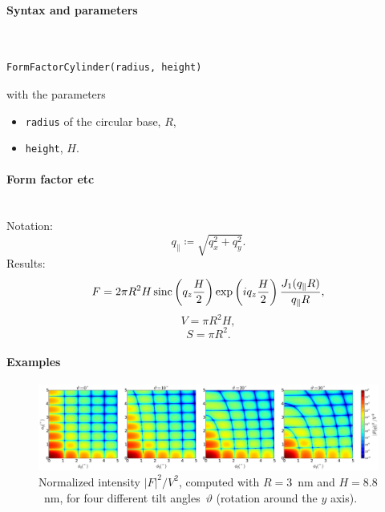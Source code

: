 \paragraph{Syntax and parameters}\strut\\[-2ex plus .2ex minus .2ex]
\begin{lstlisting}[language=python, style=eclipseboxed,numbers=none,nolol]
  FormFactorCylinder(radius, height)
\end{lstlisting}
with the parameters
\begin{itemize}
\item \texttt{radius} of the circular base, $R$, 
\item \texttt{height}, $H$.
\end{itemize}


\paragraph{Form factor etc}\strut\\
Notation:
\begin{equation*}
  q_{\parallel} \coloneqq \sqrt{q_x^2+q_y^2}.
\end{equation*}
Results:
\begin{equation*}
  F=  2\pi R^2 H  \operatorname{sinc}\left(q_ z \frac{H}{2}\right) \exp\left(i q_ z \frac{H}{2}\right) 
    \frac{J_1(q_{\parallel} R )}{q_{\parallel} R },
\end{equation*}
\begin{equation*}
  V = \pi R^2 H,
\end{equation*}
\begin{equation*}
  S=\pi R^2.
\end{equation*}

\paragraph{Examples}\strut

\begin{figure}[H]
\begin{center}
\includegraphics[width=\textwidth]{fig/ff2/ff_Cylinder.pdf}
\end{center}
\caption{Normalized intensity $|F|^2/V^2$,
computed with $R=3$~nm and $H=8.8$~nm,
for four different tilt angles~$\vartheta$ (rotation around the $y$ axis).}
\end{figure}

